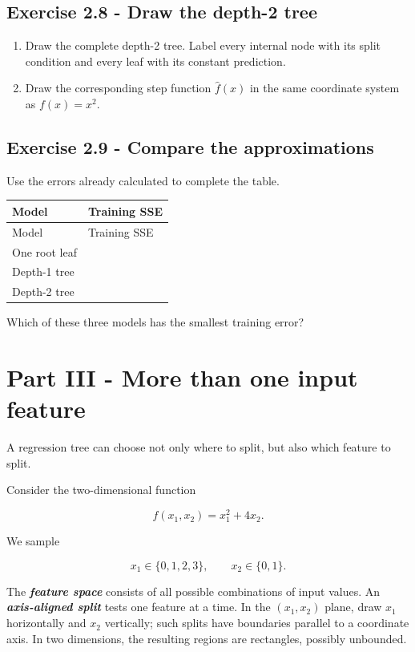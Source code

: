 \documentclass{course_sheet}
\begin{document}
\subsection*{Exercise 2.8 - Draw the depth-2 tree}
\begin{enumerate}
\item
Draw the complete depth-2 tree. Label every internal node with its split condition and every leaf with its constant prediction.

\item
Draw the corresponding step function $\hat f(x)$ in the same coordinate system as $f(x)=x^2$.

\end{enumerate}
\subsection*{Exercise 2.9 - Compare the approximations}
Use the errors already calculated to complete the table.

\begingroup
\small
\setlength{\tabcolsep}{4pt}
\begin{longtable}{l|l}
Model & Training SSE \\
\hline
\endfirsthead
Model & Training SSE \\
\hline
\endhead
One root leaf & $\phantom{0}$ \\[3pt]
Depth-1 tree & $\phantom{0}$ \\[3pt]
Depth-2 tree & $\phantom{0}$ \\[3pt]
\end{longtable}
\endgroup
Which of these three models has the smallest training error?

\clearpage
\section*{Part III - More than one input feature}
A regression tree can choose not only where to split, but also which feature to split.

Consider the two-dimensional function

\[
f(x_1,x_2)=x_1^2+4x_2.
\]

We sample

\[
x_1\in\{0,1,2,3\},
\qquad
x_2\in\{0,1\}.
\]

The \textbf{\textit{feature space}} consists of all possible combinations of input values. An \textbf{\textit{axis-aligned split}} tests one feature at a time. In the $(x_1,x_2)$ plane, draw $x_1$ horizontally and $x_2$ vertically; such splits have boundaries parallel to a coordinate axis. In two dimensions, the resulting regions are rectangles, possibly unbounded.
\end{document}

